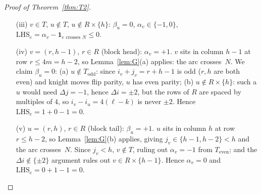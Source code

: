 \documentclass[11pt]{article}
\theoremstyle{plain}
\theoremstyle{remark}
\newcommand{\LHS}{\mathrm{LHS}}
\begin{document}
\begin{proof}[Proof of Theorem~\ref{thm:T2}]
\begin{itemize}
\emph{Sub-case $i_u\le h-2$ (i.e.\ $\alpha\ge 1$).}
The CCW condition $\Delta_j(2\alpha+1)+\Delta_i(2\beta+1)<0$ is
satisfied by $\Delta\in\{(1,-2),(-1,-2),(-2,-1)\}$ (always for
$u\in T$), $(2,-1)$ (when $\alpha\ge 2\beta+1$), and $(-2,1)$
(when $\alpha\le 2\beta$);  the other three steps are never CCW
for $u\in T$.  For $\beta\ge 2$ each of these CCW $\Delta$'s sends
$u$ to a $v$ with $j_v\ge h$, $i_v\le h-1$, and $i_v+j_v\le n-1$
(when $v$ is on the board), so $v\in T$, contradicting case (ii).
The remaining sub-cases are:
\begin{itemize}
\item $\beta=0$ (i.e.\ $j_u=h$):  Lemma~\ref{lem:G}(b) applies, so
the arc crosses~$N$.
\item $\beta=1$ (i.e.\ $j_u=h+1$):  the only CCW arcs with $j_v<h$
are $\Delta\in\{(1,-2),(-1,-2)\}$, both with $j_v=h-1$;  the
crossing of $j=p_j$ at parameter $t^*=3/4$ has height
$i_u\pm 3/4\le h-5/4<p_i$, so the arc crosses~$N$.
\end{itemize}

\emph{Sub-case $i_u=h-1$ (i.e.\ $\alpha=0$).}  Parity then forces
$\beta=0$, so $u=(h-1,h)$.  Of its four CCW knight arcs, the one
with $v\in T$, namely $(h-1,h)\to(h-3,h+1)$, is excluded by the
case~(ii) hypothesis;  the remaining ones lying on the board are
$(h-1,h)\to(h,h-2)$ and $(h-1,h)\to(h-2,h-2)$ (always), plus
$(h-1,h)\to(h-3,h-1)$ for $h\ge 3$.  Their crossing heights at
$j=p_j$ are $h-\tfrac34$, $h-\tfrac54$, $h-2$ respectively, each
strictly below $p_i=h-\tfrac12$, so all three cross~$N$.

In every sub-case $\LHS_e=0+1-1=0$.

\item[(iii)] $v\in T$, $u\notin T$, $u\notin R\times\{h\}$:
$\beta_u=0$, $\alpha_v\in\{-1,0\}$,
$\LHS_e=\alpha_v-\mathbf{1}_{e\text{ crosses }N}\le 0$.

\item[(iv)] $v=(r,h-1)$, $r\in R$ (block head):  $\alpha_v=+1$.
$v$ sits in column $h-1$ at row $r\le 4m=h-2$, so
Lemma~\ref{lem:G}(a) applies:  the arc crosses~$N$.  We claim
$\beta_u=0$:
(a) $u\notin T_{\mathrm{odd}}$: since $i_v+j_v=r+h-1$ is odd
($r,h$ are both even) and knight moves flip parity, $u$ has even
parity;
(b) $u\notin R\times\{h\}$: such a $u$ would need $\Delta j=-1$,
hence $\Delta i=\pm 2$, but the rows of $R$ are spaced by multiples
of $4$, so $i_v-i_u=4(\ell-k)$ is never $\pm 2$.
Hence $\LHS_e=1+0-1=0$.

\item[(v)] $u=(r,h)$, $r\in R$ (block tail):  $\beta_u=+1$.
$u$ sits in column $h$ at row $r\le h-2$, so Lemma~\ref{lem:G}(b)
applies, giving $j_v\in\{h-1,h-2\}<h$ and the arc crosses~$N$.
Since $j_v<h$, $v\notin T$, ruling out $\alpha_v=-1$ from
$T_{\mathrm{even}}$;  and the $\Delta i\notin\{\pm 2\}$ argument
rules out $v\in R\times\{h-1\}$.  Hence $\alpha_v=0$ and
$\LHS_e=0+1-1=0$.


\end{itemize}
\end{proof}
\end{document}

